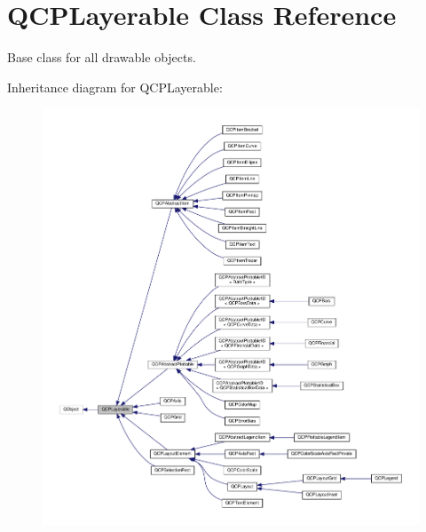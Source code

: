 \hypertarget{classQCPLayerable}{}\section{Q\+C\+P\+Layerable Class Reference}
\label{classQCPLayerable}


Base class for all drawable objects.  




Inheritance diagram for Q\+C\+P\+Layerable\+:\nopagebreak
\begin{figure}[H]
\begin{center}
\leavevmode
\includegraphics[width=350pt]{classQCPLayerable__inherit__graph}
\end{center}
\end{figure}


